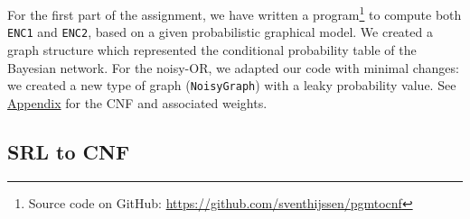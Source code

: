 \documentclass{article}
\begin{document}
For the first part of the assignment, we have written a program\footnote{Source code on GitHub: \href{https://github.com/sventhijssen/pgmtocnf}{https://github.com/sventhijssen/pgmtocnf}} to compute both \texttt{ENC1} and \texttt{ENC2}, based on a given probabilistic graphical model. We created a graph structure which represented the conditional probability table of the Bayesian network. For the noisy-OR, we adapted our code with minimal changes: we created a new type of graph (\texttt{NoisyGraph}) with a leaky probability value. See \hyperref[appendix]{Appendix} for the CNF and associated weights.

\newpage
 
\subsection{SRL to CNF}
\end{document}
